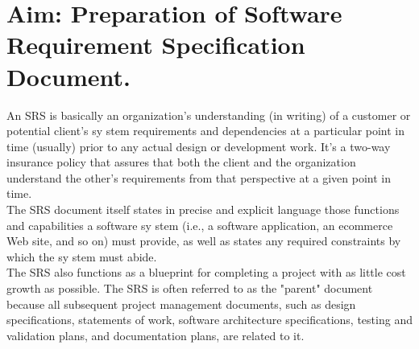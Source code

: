 \section*{\fontsize{16}{14}\selectfont Aim: Preparation of Software Requirement Specification Document.}
An SRS is basically
 an organization's understanding (in writing) of a customer or potential
client's sy
stem requirements and dependencies at a particular point in time (usually) prior to
any
 actual design or development work. It's a two-way
 insurance policy
 that assures that both
the client and the organization understand the other's requirements from that perspective at a
given point in time.\\

The SRS document itself states in precise and explicit language those functions and
capabilities a software sy
stem (i.e., a software application, an ecommerce Web site, and so
on) must provide, as well as states any
 required constraints by
 which the sy
stem must abide.\\

The SRS also functions as a blueprint for completing a project with as little cost growth as
possible. The SRS is often referred to as the "parent" document because all subsequent
project management documents, such as design specifications, statements of work, software
architecture specifications, testing and validation plans, and documentation plans, are related
to it.\\


